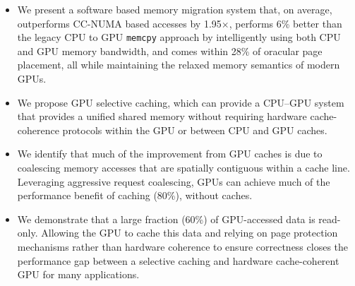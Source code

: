 \begin{itemize}

\item 
We present a software based memory migration system that, on average,
outperforms CC-NUMA based accesses by 1.95$\times$, performs 6\% better than the
legacy CPU to GPU {\tt memcpy} approach by intelligently using both CPU and GPU
memory bandwidth, and comes within 28\% of oracular page placement, all while
maintaining the relaxed memory semantics of modern GPUs.

\item
We propose GPU selective caching, which can provide a CPU--GPU system that
provides a unified shared memory without requiring hardware cache-coherence
protocols within the GPU or between CPU and GPU caches.

\item
We identify that much of the improvement from GPU caches is due to coalescing 
memory accesses that are spatially contiguous within a cache line.  Leveraging
aggressive request coalescing, GPUs can achieve much of the performance benefit
of caching (80\%), without caches.


\item
We demonstrate that a large fraction (60\%) of GPU-accessed data is read-only.
Allowing the GPU to cache this data and relying on page protection mechanisms
rather than hardware coherence to ensure correctness closes the performance gap
between a selective caching and hardware cache-coherent GPU for many
applications.
\end{itemize}

